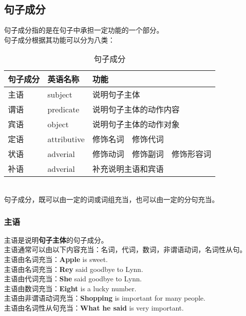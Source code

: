 \documentclass[UTF8]{ctexart}
\begin{document}
\subsection{句子成分}
    句子成分指的是在句子中承担一定功能的一个部分。\\[3mm]
    句子成分根据其功能可以分为八类：\vspace{5pt}
    \begin{table}[h!]
        \begin{center}
            \begin{tabular}{p{60pt}|p{80pt}|p{180pt}}
                \hline
                句子成分&英语名称&功能\\ \hline
                主语&subject&说明句子主体\\ \hline
                谓语&predicate&说明句子主体的动作内容\\ \hline
                宾语&object&说明句子主体的动作对象\\ \hline
                定语&attributive&修饰名词~~修饰代词\\ \hline
                状语&adverial&修饰动词~~修饰副词~~修饰形容词\\ \hline
                补语&adverial&补充说明主语和宾语\\ \hline
            \end{tabular}
            \caption{句子成分}
        \end{center}
    \end{table}\\
    句子成分，既可以由一定的词或词组充当，也可以由一定的分句充当。

\newpage

\subsubsection{主语}
    主语是说明\textbf{句子主体}的句子成分。\\[3mm]
    主语通常可以由以下内容充当：名词，代词，数词，非谓语动词，名词性从句。\\[6mm]
    主语由名词充当：\textbf{Apple} is sweet.\\[3mm]
    主语由名词充当：\textbf{Rey} said goodbye to Lynn.\\[3mm]
    主语由代词充当：\textbf{She} said goodbye to Lynn.\\[3mm]
    主语由数词充当：\textbf{Eight} is a lucky number.\\[3mm]
    主语由非谓语动词充当：\textbf{Shopping} is important for many people.\\[3mm]
    主语由名词性从句充当：\textbf{What he said} is very important.\\
\end{document}
